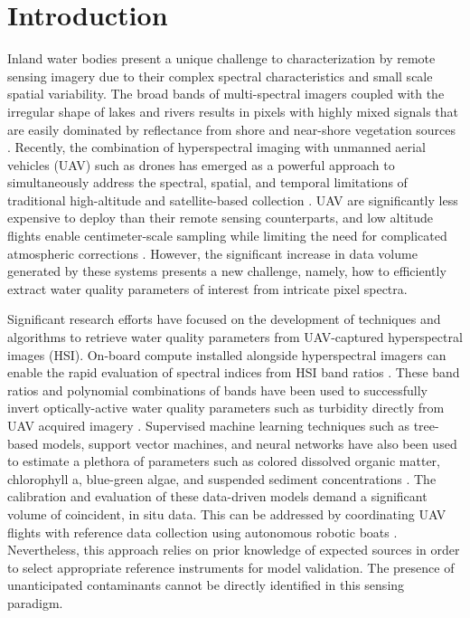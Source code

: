\documentclass[remotesensing,article,submit,pdftex,moreauthors]{Definitions/mdpi}
\begin{document}
\section{Introduction}

Inland water bodies present a unique challenge to characterization by remote sensing imagery due to their complex spectral characteristics and small scale spatial variability. The broad bands of multi-spectral imagers coupled with the irregular shape of lakes and rivers results in pixels with highly mixed signals that are easily dominated by reflectance from shore and near-shore vegetation sources \cite{koponen2002lake, ritchie2003remote}. Recently, the combination of hyperspectral imaging with unmanned aerial vehicles (UAV) such as drones has emerged as a powerful approach to simultaneously address the spectral, spatial, and temporal limitations of traditional high-altitude and satellite-based collection \cite{adao2017hyperspectral,arroyo2019implementation}. UAV are significantly less expensive to deploy than their remote sensing counterparts, and low altitude flights enable centimeter-scale sampling while limiting the need for complicated atmospheric corrections \cite{banerjee2020uav}. However, the significant increase in data volume generated by these systems presents a new challenge, namely, how to efficiently extract water quality parameters of interest from intricate pixel spectra.

Significant research efforts have focused on the development of techniques and algorithms to retrieve water quality parameters from UAV-captured hyperspectral images (HSI). On-board compute installed alongside hyperspectral imagers can enable the rapid evaluation of spectral indices from HSI band ratios \cite{horstrand2019uav}. These band ratios and polynomial combinations of bands have been used to successfully invert optically-active water quality parameters such as turbidity directly from UAV acquired imagery \cite{vogt2016near, zhang2022selection}. Supervised machine learning techniques such as tree-based models, support vector machines, and neural networks have also been used to estimate a plethora of parameters such as colored dissolved organic matter, chlorophyll a, blue-green algae, and suspended sediment concentrations \cite{keller2018hyperspectral, lu2021retrieval}. The calibration and evaluation of these data-driven models demand a significant volume of coincident, in situ data. This can be addressed by coordinating UAV flights with reference data collection using autonomous robotic boats \cite{robot-team-1, robot-team-2}. Nevertheless, this approach relies on prior knowledge of expected sources in order to select appropriate reference instruments for model validation. The presence of unanticipated contaminants cannot be directly identified in this sensing paradigm. 
\end{document}
